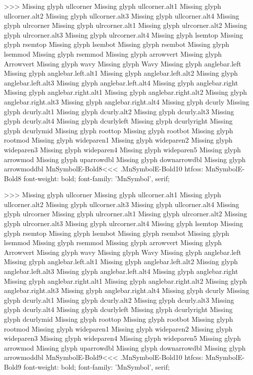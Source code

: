 >>>
Missing glyph	ullcorner
Missing glyph	ullcorner.alt1
Missing glyph	ullcorner.alt2
Missing glyph	ullcorner.alt3
Missing glyph	ullcorner.alt4
Missing glyph	ulrcorner
Missing glyph	ulrcorner.alt1
Missing glyph	ulrcorner.alt2
Missing glyph	ulrcorner.alt3
Missing glyph	ulrcorner.alt4
Missing glyph	lsemtop
Missing glyph	rsemtop
Missing glyph	lsembot
Missing glyph	rsembot
Missing glyph	lsemmod
Missing glyph	rsemmod
Missing glyph	arrowvert
Missing glyph	Arrowvert
Missing glyph	wavy
Missing glyph	Wavy
Missing glyph	anglebar.left
Missing glyph	anglebar.left.alt1
Missing glyph	anglebar.left.alt2
Missing glyph	anglebar.left.alt3
Missing glyph	anglebar.left.alt4
Missing glyph	anglebar.right
Missing glyph	anglebar.right.alt1
Missing glyph	anglebar.right.alt2
Missing glyph	anglebar.right.alt3
Missing glyph	anglebar.right.alt4
Missing glyph	dcurly
Missing glyph	dcurly.alt1
Missing glyph	dcurly.alt2
Missing glyph	dcurly.alt3
Missing glyph	dcurly.alt4
Missing glyph	dcurlyleft
Missing glyph	dcurlyright
Missing glyph	dcurlymid
Missing glyph	roottop
Missing glyph	rootbot
Missing glyph	rootmod
Missing glyph	wideparen1
Missing glyph	wideparen2
Missing glyph	wideparen3
Missing glyph	wideparen4
Missing glyph	wideparen5
Missing glyph	arrowmod
Missing glyph	uparrowdbl
Missing glyph	downarrowdbl
Missing glyph	arrowmoddbl
\<MnSymbolE-Bold8\><<<
.MnSymbolE-Bold10
htfcss:  MnSymbolE-Bold8  font-weight: bold; font-family: 'MnSymbol', serif;

>>>
Missing glyph	ullcorner
Missing glyph	ullcorner.alt1
Missing glyph	ullcorner.alt2
Missing glyph	ullcorner.alt3
Missing glyph	ullcorner.alt4
Missing glyph	ulrcorner
Missing glyph	ulrcorner.alt1
Missing glyph	ulrcorner.alt2
Missing glyph	ulrcorner.alt3
Missing glyph	ulrcorner.alt4
Missing glyph	lsemtop
Missing glyph	rsemtop
Missing glyph	lsembot
Missing glyph	rsembot
Missing glyph	lsemmod
Missing glyph	rsemmod
Missing glyph	arrowvert
Missing glyph	Arrowvert
Missing glyph	wavy
Missing glyph	Wavy
Missing glyph	anglebar.left
Missing glyph	anglebar.left.alt1
Missing glyph	anglebar.left.alt2
Missing glyph	anglebar.left.alt3
Missing glyph	anglebar.left.alt4
Missing glyph	anglebar.right
Missing glyph	anglebar.right.alt1
Missing glyph	anglebar.right.alt2
Missing glyph	anglebar.right.alt3
Missing glyph	anglebar.right.alt4
Missing glyph	dcurly
Missing glyph	dcurly.alt1
Missing glyph	dcurly.alt2
Missing glyph	dcurly.alt3
Missing glyph	dcurly.alt4
Missing glyph	dcurlyleft
Missing glyph	dcurlyright
Missing glyph	dcurlymid
Missing glyph	roottop
Missing glyph	rootbot
Missing glyph	rootmod
Missing glyph	wideparen1
Missing glyph	wideparen2
Missing glyph	wideparen3
Missing glyph	wideparen4
Missing glyph	wideparen5
Missing glyph	arrowmod
Missing glyph	uparrowdbl
Missing glyph	downarrowdbl
Missing glyph	arrowmoddbl
\<MnSymbolE-Bold9\><<<
.MnSymbolE-Bold10
htfcss:  MnSymbolE-Bold9  font-weight: bold; font-family: 'MnSymbol', serif;

